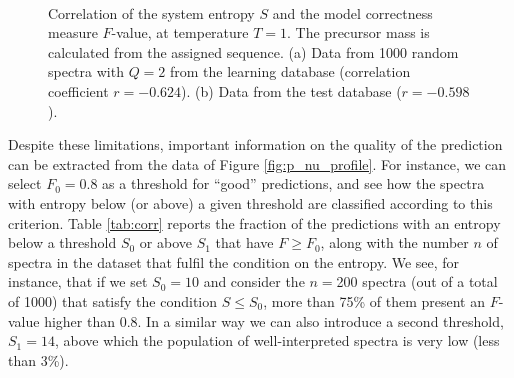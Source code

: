 \begin{figure}
\centering
\subfigure[Learn db]{
\resizebox{0.45\textwidth}{!}{\sffamily}}
\subfigure[Test db]{
\resizebox{0.45\textwidth}{!}{\sffamily}}\\
\caption{\label{fig:corr}
Correlation of the system entropy $S$ and the model correctness measure
$F$-value, at temperature $T=1$. The
precursor mass is calculated from the assigned sequence.
(a) Data from 1000
random spectra with $Q=2$ from the learning database (correlation coefficient $r=-0.624$). (b) Data from
the test database ($r=-0.598$).}
\end{figure}

Despite these limitations, important information on the quality of the prediction can be extracted from the data of Figure \ref{fig:p_nu_profile}. For instance, we can select $F_0=0.8$ as a threshold for ``good'' predictions, and see how the spectra with entropy below (or above) a given threshold are classified according to this criterion.
Table \ref{tab:corr} reports the fraction of the predictions with an entropy below a threshold $S_0$ or above $S_1$ that have $F \ge F_0$, along with the number $n$ of spectra in the dataset that fulfil the condition on the entropy.
We see, for instance, that if we set $S_0=10$ and consider the $n=$200 spectra (out of a total of 1000) that satisfy the condition $S \leq S_0$,  more than 75\% of them  present an $F$-value higher than 0.8.
In a similar way we can also introduce a second threshold, $S_1=14$, above which
the population of well-interpreted spectra is very low (less than 3\%).

